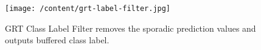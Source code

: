 \begin{figure}
	[h] \centering 
	\texttt{[image: /content/grt-label-filter.jpg]} \caption{GRT Class Label Filter removes the sporadic prediction values and outputs buffered class label. \cite{16}} \label{fg:grt:label} 
\end{figure}
